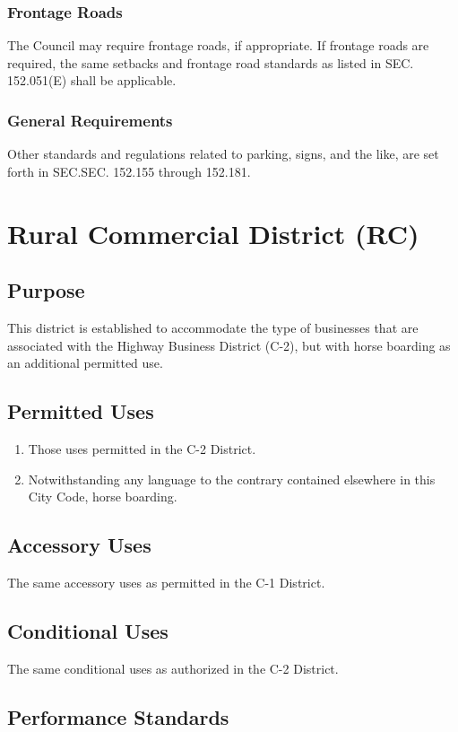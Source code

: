 \subsubsection{Frontage Roads}
The Council may require frontage roads, if appropriate.  If frontage roads are required, the same setbacks and frontage road standards as listed in SEC. 152.051(E) shall be applicable.
\subsubsection{General Requirements}
Other standards and regulations related to parking, signs, and the like, are set forth in SEC.SEC. 152.155 through 152.181.

\setcounter{section}{53}
\section{Rural Commercial District (RC)}
\subsection{Purpose}
This district is established to accommodate the type of businesses that are associated with the Highway Business District (C-2), but with horse boarding as an additional permitted use.
\subsection{Permitted Uses}
\begin{enumerate}[{\indent}1)]
    \item Those uses permitted in the C-2 District.
    \item Notwithstanding any language to the contrary contained elsewhere in this City Code, horse boarding.
\end{enumerate}
\subsection{Accessory Uses}
The same accessory uses as permitted in the C-1 District.
\subsection{Conditional Uses}
The same conditional uses as authorized in the C-2 District.
\subsection{Performance Standards}

